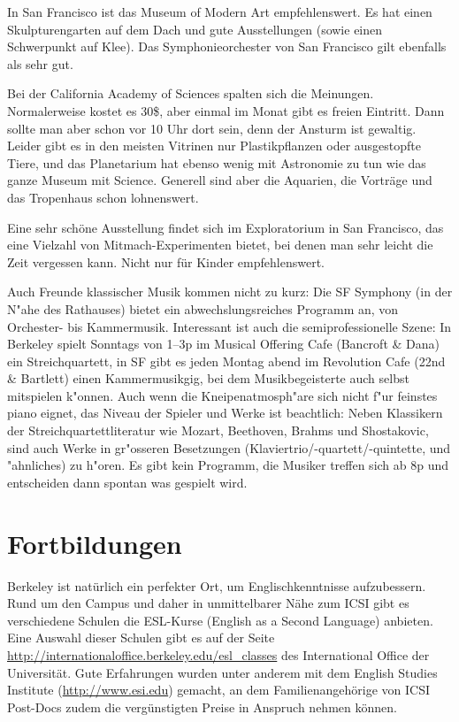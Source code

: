 \documentclass[a4paper]{scrreprt}
\begin{document}
In San Francisco ist das Museum of Modern Art empfehlenswert. Es hat einen Skulpturengarten auf dem Dach und gute Ausstellungen (sowie einen Schwerpunkt auf Klee). Das Symphonie\-orchester von San Francisco gilt ebenfalls als sehr gut.

Bei der California Academy of Sciences spalten sich die Meinungen. Normalerweise kostet es 30\$, aber einmal im Monat gibt es freien Eintritt. Dann sollte man aber schon vor 10 Uhr dort sein, denn der Ansturm ist gewaltig. Leider gibt es in den meisten Vitrinen nur Plastikpflanzen oder ausgestopfte Tiere, und das Planetarium hat ebenso wenig mit Astronomie zu tun wie das ganze Museum mit Science. Generell sind aber die Aquarien, die Vorträge und das Tropenhaus schon lohnenswert.

Eine sehr schöne Ausstellung findet sich im Exploratorium in San Francisco, das eine Vielzahl von Mitmach-Experimenten bietet, bei denen man sehr leicht die Zeit vergessen kann. Nicht nur für Kinder empfehlenswert.

Auch Freunde klassischer Musik kommen nicht zu kurz: Die SF Symphony (in der N"ahe des Rathauses) bietet ein abwechslungsreiches Programm an, von Orchester- bis Kammermusik.
Interessant ist auch die semiprofessionelle Szene: In Berkeley spielt Sonntags von 1--3p im Musical Offering Cafe (Bancroft \& Dana) ein Streichquartett, in SF gibt es jeden Montag abend im Revolution Cafe (22nd \& Bartlett) einen Kammermusikgig, bei dem Musikbegeisterte auch selbst mitspielen k"onnen. Auch wenn die Kneipenatmosph"are sich nicht f"ur feinstes piano eignet, das Niveau der Spieler und Werke ist beachtlich: Neben Klassikern der Streichquartettliteratur wie Mozart, Beethoven, Brahms und Shostakovic, sind auch Werke in gr"osseren Besetzungen (Klaviertrio/-quartett/-quintette, und "ahnliches) zu h"oren. Es gibt kein Programm, die Musiker treffen sich ab 8p und entscheiden dann spontan was gespielt wird.
 
\section{Fortbildungen}

Berkeley ist natürlich ein perfekter Ort, um Englischkenntnisse
aufzubessern. Rund um den Campus und daher in unmittelbarer Nähe zum
ICSI gibt es verschiedene Schulen die ESL-Kurse (English as a Second
Language) anbieten. Eine Auswahl dieser Schulen gibt es auf der Seite
\url{http://internationaloffice.berkeley.edu/esl_classes} des International
Office der Universität. Gute Erfahrungen wurden unter anderem mit dem English Studies Institute (\url{http://www.esi.edu}) gemacht, an dem Familienangehörige von ICSI Post-Docs zudem die vergünstigten Preise in Anspruch nehmen können.
\end{document}
